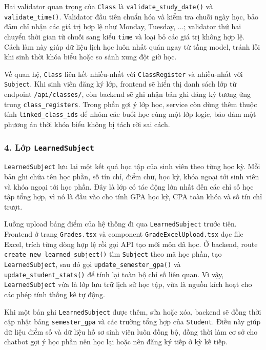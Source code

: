 \documentclass[12pt,a4paper]{report}
\begin{document}
Hai validator quan trọng của \texttt{Class} là \texttt{validate\_study\_date()} và \texttt{validate\_time()}. Validator đầu tiên chuẩn hóa và kiểm tra chuỗi ngày học, bảo đảm chỉ nhận các giá trị hợp lệ như Monday, Tuesday, ...; validator thứ hai chuyển thời gian từ chuỗi sang kiểu \texttt{time} và loại bỏ các giá trị không hợp lệ. Cách làm này giúp dữ liệu lịch học luôn nhất quán ngay từ tầng model, tránh lỗi khi sinh thời khóa biểu hoặc so sánh xung đột giờ học.

Về quan hệ, \texttt{Class} liên kết nhiều-nhất với \texttt{ClassRegister} và nhiều-nhất với \texttt{Subject}. Khi sinh viên đăng ký lớp, frontend sẽ hiển thị danh sách lớp từ endpoint \texttt{/api/classes/}, còn backend sẽ ghi nhận bản ghi đăng ký tương ứng trong \texttt{class\_registers}. Trong phần gợi ý lớp học, service còn dùng thêm thuộc tính \texttt{linked\_class\_ids} để nhóm các buổi học cùng một lớp logic, bảo đảm một phương án thời khóa biểu không bị tách rời sai cách.

\subsubsection{4. Lớp \texttt{LearnedSubject}}
\texttt{LearnedSubject} lưu lại một kết quả học tập của sinh viên theo từng học kỳ. Mỗi bản ghi chứa tên học phần, số tín chỉ, điểm chữ, học kỳ, khóa ngoại tới sinh viên và khóa ngoại tới học phần. Đây là lớp có tác động lớn nhất đến các chỉ số học tập tổng hợp, vì nó là đầu vào cho tính GPA học kỳ, CPA toàn khóa và số tín chỉ trượt.

Luồng upload bảng điểm của hệ thống đi qua \texttt{LearnedSubject} trước tiên. Frontend ở trang \texttt{Grades.tsx} và component \texttt{GradeExcelUpload.tsx} đọc file Excel, trích từng dòng hợp lệ rồi gọi API tạo mới môn đã học. Ở backend, route \texttt{create\_new\_learned\_subject()} tìm \texttt{Subject} theo mã học phần, tạo \texttt{LearnedSubject}, sau đó gọi \texttt{update\_semester\_gpa()} và \texttt{update\_student\_stats()} để tính lại toàn bộ chỉ số liên quan. Vì vậy, \texttt{LearnedSubject} vừa là lớp lưu trữ lịch sử học tập, vừa là nguồn kích hoạt cho các phép tính thống kê tự động.

Khi một bản ghi \texttt{LearnedSubject} được thêm, sửa hoặc xóa, backend sẽ đồng thời cập nhật bảng \texttt{semester\_gpa} và các trường tổng hợp của \texttt{Student}. Điều này giúp dữ liệu điểm số và dữ liệu hồ sơ sinh viên luôn đồng bộ, đồng thời làm cơ sở cho chatbot gợi ý học phần nên học lại hoặc nên đăng ký tiếp ở kỳ kế tiếp.
\end{document}
